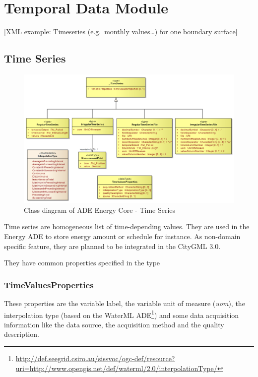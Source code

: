 \documentclass[a4paper,12pt]{article}
\renewcommand{\href}[2]{#2\footnote{\url{#1}}}
\let\stdsection\section%
\renewcommand\section{\newpage\stdsection}
\begin{document}
\section{Temporal Data Module}\label{temporal-data-module}

{[}XML example: Timeseries (e.g.~monthly values\ldots{}) for one
boundary surface{]}

\subsection{Time Series}\label{time-series}

\begin{figure}[htbp]
\centering
\includegraphics{fig/class_time.png}
\caption{Class diagram of ADE Energy Core - Time Series}
\end{figure}

Time series are homogeneous list of time-depending values. They are used
in the Energy ADE to store energy amount or schedule for instance. As
non-domain specific feature, they are planned to be integrated in the
CityGML 3.0.

They have common properties specified in the type

\subsubsection{TimeValuesProperties}\label{timevaluesproperties}

These properties are the variable label, the variable unit of measure
(\emph{uom}), the interpolation type (based on the
\href{http://def.seegrid.csiro.au/sissvoc/ogc-def/resource?uri=http://www.opengis.net/def/waterml/2.0/interpolationType/}{WaterML
ADE}) and some data acquisition information like the data source, the
acquisition method and the quality description.
\end{document}
